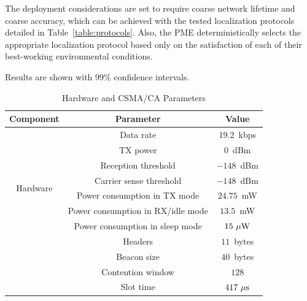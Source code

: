 The deployment considerations are set to require coarse network lifetime and coarse accuracy, which can be achieved with the tested localization protocols detailed in Table~\ref{table:protocols}. Also, the PME deterministically selects the appropriate localization protocol based only on the satisfaction of each of their best-working environmental conditions.

Results are shown with 99\% confidence intervals.

\begin{table}[htbp]
  \begin{threeparttable}[t]
    \caption{Hardware and CSMA/CA Parameters}
    \label{tab:MAC_param}
    \begin{tabular}{c||c||c}
    \hline
    \bfseries Component & \bfseries Parameter & \bfseries Value\\
    \hline\hline 
    \multirow{8}{*}{Hardware} & Data rate & $19.2$~kbps\\ %
			      & TX power & $0$~dBm\\ %
			      & Reception threshold & $-148$~dBm\\ %
			      & Carrier sense threshold & $-148$~dBm\\ %
			      & Power consumption in TX mode & $24.75$~mW\\ %
			      & Power consumption in RX/idle mode & $13.5$~mW\\ %
			      & Power consumption in sleep mode & $15~\mu\rm{W}$\\ %
    \hline
    \multirow{4}{*}{CSMA/CA} & Headers & $11$~bytes\\ %
			      & Beacon size & $40$~bytes\\ %
			      & Contention window & $128$\\ %
			      & Slot time & $417~\mu\rm{s}$\\ %
    \hline
    \end{tabular}
  \end{threeparttable}
\end{table}


